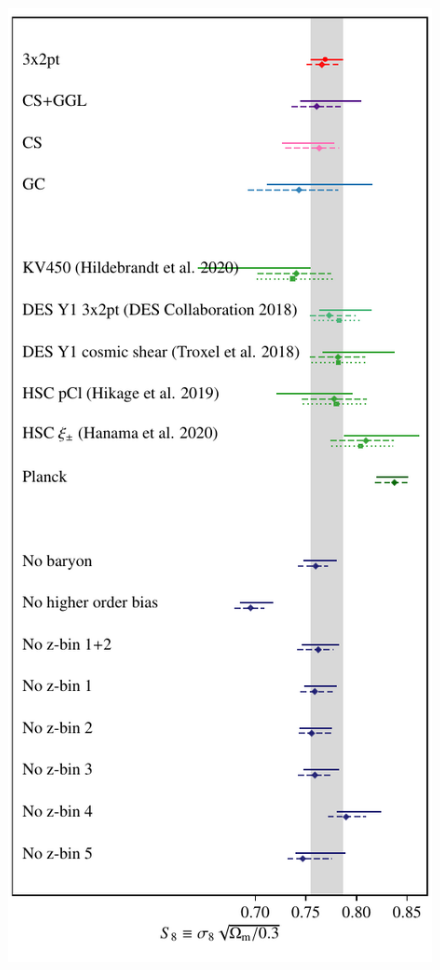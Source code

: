 \begin{figure}
\begin{center}
		\includegraphics[width=\columnwidth]{Parameter_Plots/systematics/S8_comparison_blindC}

\end{center}
\end{figure}
